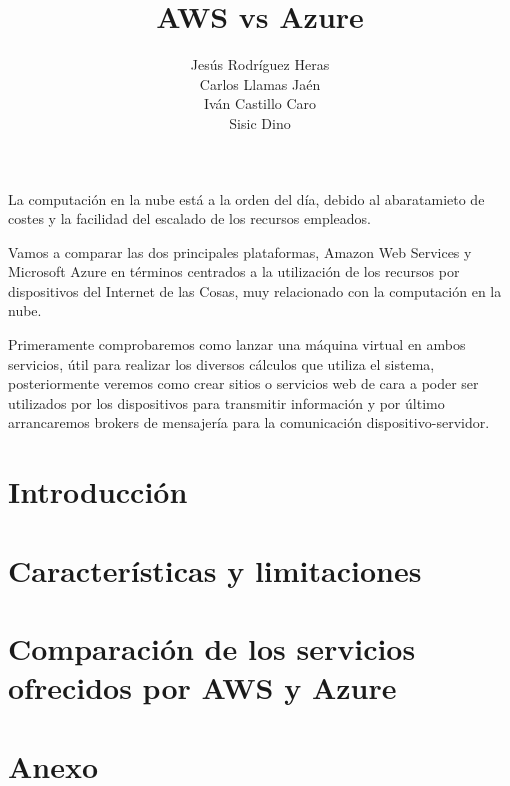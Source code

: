 \documentclass{book}
\title{\huge{AWS vs Azure}}
\author{Jesús Rodríguez Heras\\
	Carlos Llamas Jaén\\
	Iván Castillo Caro\\
	Sisic Dino}
\begin{document}
	\maketitle
	
	\newpage{\pagestyle{empty}\cleardoublepage}
	
	\vspace*{\fill}
	La computación en la nube está a la orden del día, debido al abaratamieto de costes y la facilidad del escalado de los recursos empleados.
	
	Vamos a comparar las dos principales plataformas, Amazon Web Services y Microsoft Azure en términos centrados a la utilización de los recursos por dispositivos del Internet de las Cosas, muy relacionado con la computación en la nube.
	
	Primeramente comprobaremos como lanzar una máquina virtual en ambos servicios, útil para realizar los diversos cálculos que utiliza el sistema, posteriormente veremos como crear sitios o servicios web de cara a poder ser utilizados por los dispositivos para transmitir información y por último arrancaremos brokers de mensajería para la comunicación dispositivo-servidor.
	\vspace*{\fill}
	
	\tableofcontents
	\newpage
	
	\part{Introducción}
	
	
	
	\part{Características y limitaciones}
	
	
	
	\part{Comparación de los servicios ofrecidos por AWS y Azure}
	
	
	
	
	\part{Anexo}
	
	
\end{document}
